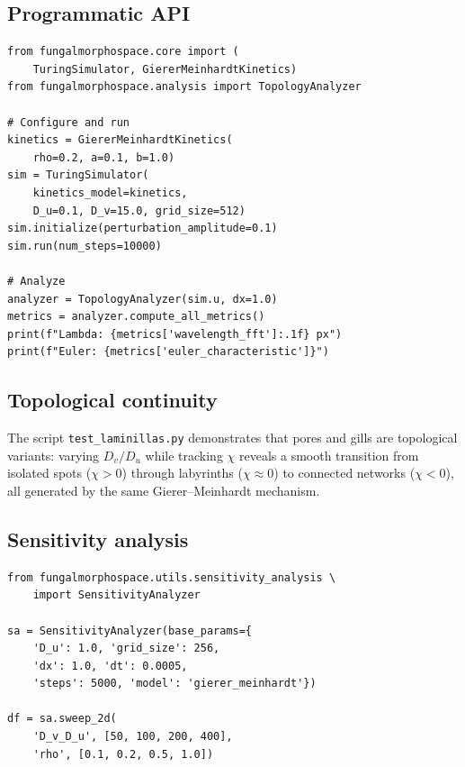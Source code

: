 \documentclass[review,3p]{elsarticle}
\begin{document}
\subsection{Programmatic API}

\begin{lstlisting}[caption={Python API usage.},label=lst:api]
from fungalmorphospace.core import (
    TuringSimulator, GiererMeinhardtKinetics)
from fungalmorphospace.analysis import TopologyAnalyzer

# Configure and run
kinetics = GiererMeinhardtKinetics(
    rho=0.2, a=0.1, b=1.0)
sim = TuringSimulator(
    kinetics_model=kinetics,
    D_u=0.1, D_v=15.0, grid_size=512)
sim.initialize(perturbation_amplitude=0.1)
sim.run(num_steps=10000)

# Analyze
analyzer = TopologyAnalyzer(sim.u, dx=1.0)
metrics = analyzer.compute_all_metrics()
print(f"Lambda: {metrics['wavelength_fft']:.1f} px")
print(f"Euler: {metrics['euler_characteristic']}")
\end{lstlisting}

\subsection{Topological continuity}

The script \texttt{test\_laminillas.py} demonstrates that pores and
gills are topological variants: varying $D_v/D_u$ while tracking
$\chi$ reveals a smooth transition from isolated spots ($\chi > 0$)
through labyrinths ($\chi \approx 0$) to connected networks
($\chi < 0$), all generated by the same Gierer--Meinhardt mechanism.

\subsection{Sensitivity analysis}

\begin{lstlisting}[caption={Parameter sweep.},label=lst:sweep]
from fungalmorphospace.utils.sensitivity_analysis \
    import SensitivityAnalyzer

sa = SensitivityAnalyzer(base_params={
    'D_u': 1.0, 'grid_size': 256,
    'dx': 1.0, 'dt': 0.0005,
    'steps': 5000, 'model': 'gierer_meinhardt'})

df = sa.sweep_2d(
    'D_v_D_u', [50, 100, 200, 400],
    'rho', [0.1, 0.2, 0.5, 1.0])
\end{lstlisting}
\end{document}
